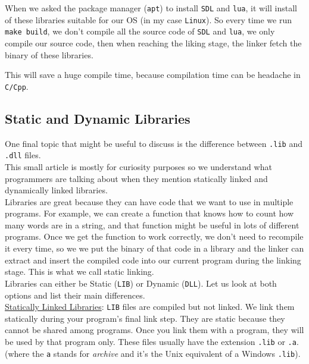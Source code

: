 When we asked the package manager (\verb|apt|) to install \verb|SDL| and \verb|lua|, it will install  of these libraries suitable for our OS (in my case \verb|Linux|). So every time we run \verb|make build|, we don't compile all the source code of \verb|SDL| and \verb|lua|, we only compile our source code, then when reaching the liking stage, the linker fetch the binary of these libraries.

This will save a huge compile time, because compilation time can be headache in \verb|C/Cpp|.

\subsection{Static and Dynamic Libraries}

One final topic that might be useful to discuss is the difference between \verb|.lib| and \verb|.dll| files.\\

This small article is mostly for curiosity purposes so we understand what programmers are talking about when they mention statically linked and dynamically linked libraries.\\

Libraries are great because they can have code that we want to use in multiple programs. For example, we can create a function that knows how to count how many words are in a string, and that function might be useful in lots of different programs. Once we get the function to work correctly, we don’t need to recompile it every time, so we we put the binary of that code in a library and the linker can extract and insert the compiled code into our current program during the linking stage. This is what we call static linking.\\

Libraries can either be Static (\verb|LIB|) or Dynamic (\verb|DLL|). Let us look at both options and list their main differences.\\

\underline{Statically Linked Libraries}: \verb|LIB| files are compiled but not linked. We link them statically during your program's final link step. They are static because they cannot be shared among programs. Once you link them with a program, they will be used by that program only. These files usually have the extension \verb|.lib| or \verb|.a|. (where the \verb|a| stands for \textit{archive} and it’s the Unix equivalent of a Windows \verb|.lib|).\\

